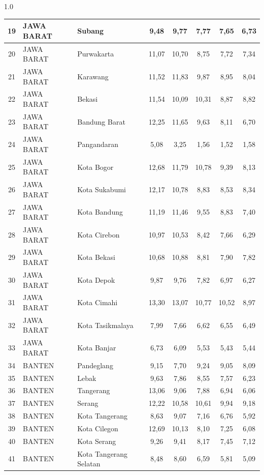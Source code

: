 \begin{spacing}{1.0}
\begin{longtable}{|c|p{2.2cm}|p{2.8cm}|c|c|c|c|c|}
19 & JAWA BARAT & Subang & 9,48 & 9,77 & 7,77 & 7,65 & 6,73 \\ \hline
20 & JAWA BARAT & Purwakarta & 11,07 & 10,70 & 8,75 & 7,72 & 7,34 \\ \hline
21 & JAWA BARAT & Karawang & 11,52 & 11,83 & 9,87 & 8,95 & 8,04 \\ \hline
22 & JAWA BARAT & Bekasi & 11,54 & 10,09 & 10,31 & 8,87 & 8,82 \\ \hline
23 & JAWA BARAT & Bandung Barat & 12,25 & 11,65 & 9,63 & 8,11 & 6,70 \\ \hline
24 & JAWA BARAT & Pangandaran & 5,08 & 3,25 & 1,56 & 1,52 & 1,58 \\ \hline
25 & JAWA BARAT & Kota Bogor & 12,68 & 11,79 & 10,78 & 9,39 & 8,13 \\ \hline
26 & JAWA BARAT & Kota Sukabumi & 12,17 & 10,78 & 8,83 & 8,53 & 8,34 \\ \hline
27 & JAWA BARAT & Kota Bandung & 11,19 & 11,46 & 9,55 & 8,83 & 7,40 \\ \hline
28 & JAWA BARAT & Kota Cirebon & 10,97 & 10,53 & 8,42 & 7,66 & 6,29 \\ \hline
29 & JAWA BARAT & Kota Bekasi & 10,68 & 10,88 & 8,81 & 7,90 & 7,82 \\ \hline
30 & JAWA BARAT & Kota Depok & 9,87 & 9,76 & 7,82 & 6,97 & 6,27 \\ \hline
31 & JAWA BARAT & Kota Cimahi & 13,30 & 13,07 & 10,77 & 10,52 & 8,97 \\ \hline
32 & JAWA BARAT & Kota Tasikmalaya & 7,99 & 7,66 & 6,62 & 6,55 & 6,49 \\ \hline
33 & JAWA BARAT & Kota Banjar & 6,73 & 6,09 & 5,53 & 5,43 & 5,44 \\ \hline
34 & BANTEN & Pandeglang & 9,15 & 7,70 & 9,24 & 9,05 & 8,09 \\ \hline
35 & BANTEN & Lebak & 9,63 & 7,86 & 8,55 & 7,57 & 6,23 \\ \hline
36 & BANTEN & Tangerang & 13,06 & 9,06 & 7,88 & 6,94 & 6,06 \\ \hline
37 & BANTEN & Serang & 12,22 & 10,58 & 10,61 & 9,94 & 9,18 \\ \hline
38 & BANTEN & Kota Tangerang & 8,63 & 9,07 & 7,16 & 6,76 & 5,92 \\ \hline
39 & BANTEN & Kota Cilegon & 12,69 & 10,13 & 8,10 & 7,25 & 6,08 \\ \hline
40 & BANTEN & Kota Serang & 9,26 & 9,41 & 8,17 & 7,45 & 7,12 \\ \hline
41 & BANTEN & Kota Tangerang Selatan & 8,48 & 8,60 & 6,59 & 5,81 & 5,09 \\ \hline
\end{longtable}
\end{spacing}
\newpage
